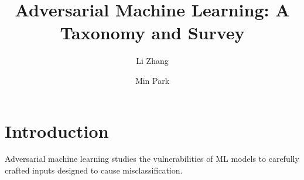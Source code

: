 \documentclass{article}
\title{Adversarial Machine Learning: A Taxonomy and Survey}
\author{Li Zhang \and Min Park}
\begin{document}
\maketitle

\section{Introduction}
Adversarial machine learning studies the vulnerabilities of ML models
to carefully crafted inputs designed to cause misclassification.
\end{document}
